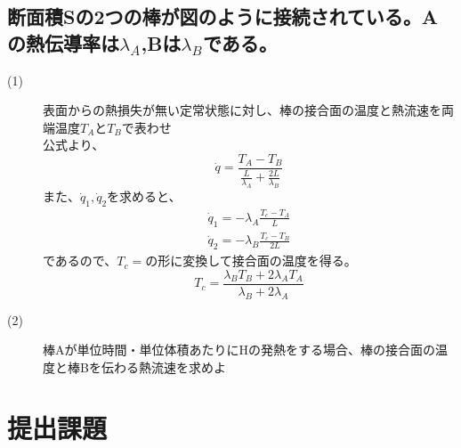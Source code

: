 \documentclass[a4j,twoside,openright,11pt]{jarticle}
\begin{document}
\subsection{断面積Sの2つの棒が図のように接続されている。Aの熱伝導率は$\lambda_A$,Bは$\lambda_B$である。}
\begin{description}
\item[(1)] 表面からの熱損失が無い定常状態に対し、棒の接合面の温度と熱流速を両端温度$T_A$と$T_B$で表わせ\\
公式より、
\begin{equation}
\dot q = \frac{T_A - T_B}{\frac{L}{ \lambda_A} + \frac{2L}{\lambda_B} }
\end{equation}
また、$\dot q_1,\dot q_2$を求めると、
\begin{eqnarray}
\dot q_1 = -\lambda_A \frac{T_c-T_A}{L}\\
\dot q_2 = -\lambda_B \frac{T_c-T_B}{2L}
\end{eqnarray}
であるので、$T_c=$の形に変換して接合面の温度を得る。
\begin{equation}
T_c = \frac{\lambda_BT_B+2\lambda_AT_A}{\lambda_B+2\lambda_A}
\end{equation}

\item[(2)] 棒Aが単位時間・単位体積あたりにHの発熱をする場合、棒の接合面の温度と棒Bを伝わる熱流速を求めよ\\

\end{description}


\section{提出課題}
\end{document}
